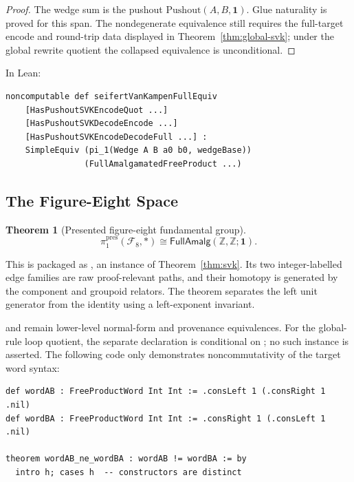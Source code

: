 \documentclass{lmcs}
\theoremstyle{definition}
\theoremstyle{plain}
\newtheorem{theorem}[definition]{Theorem}
\theoremstyle{remark}
\newcommand{\piOne}{\pi_1}
\newcommand{\Pushout}{\mathrm{Pushout}}
\newcommand{\ZZ}{\mathbb{Z}}
\begin{document}
\begin{proof}
The wedge sum is the pushout $\Pushout(A, B, \mathbf{1})$.  Glue naturality
is proved for this span.  The nondegenerate equivalence still requires the
full-target encode and round-trip data displayed in
Theorem~\ref{thm:global-svk}; under the global rewrite quotient the collapsed
equivalence is unconditional.
\end{proof}

In Lean:
\begin{lstlisting}
noncomputable def seifertVanKampenFullEquiv
    [HasPushoutSVKEncodeQuot ...]
    [HasPushoutSVKDecodeEncode ...]
    [HasPushoutSVKEncodeDecodeFull ...] :
    SimpleEquiv (pi_1(Wedge A B a0 b0, wedgeBase))
                (FullAmalgamatedFreeProduct ...)
\end{lstlisting}

\subsection{The Figure-Eight Space}

\begin{theorem}[Presented figure-eight fundamental group]
\[
\piOne^{\mathrm{pres}}(\mathcal F_8,*)
\cong
\mathsf{FullAmalg}(\ZZ,\ZZ;\mathbf 1).
\]
\end{theorem}

This is packaged as , an instance of
Theorem~\ref{thm:svk}.  Its two integer-labelled edge families are raw
proof-relevant paths, and their homotopy is generated by the component and
groupoid relators.  The theorem
 separates the left unit generator from
the identity using a left-exponent invariant.

 and
 remain lower-level normal-form and provenance
equivalences.
For the global-rule loop quotient, the separate declaration
 is conditional on
; no such instance is asserted.  The
following code only demonstrates noncommutativity of the target word syntax:
\begin{lstlisting}
def wordAB : FreeProductWord Int Int := .consLeft 1 (.consRight 1 .nil)
def wordBA : FreeProductWord Int Int := .consRight 1 (.consLeft 1 .nil)

theorem wordAB_ne_wordBA : wordAB != wordBA := by
  intro h; cases h  -- constructors are distinct
\end{lstlisting}
\end{document}

